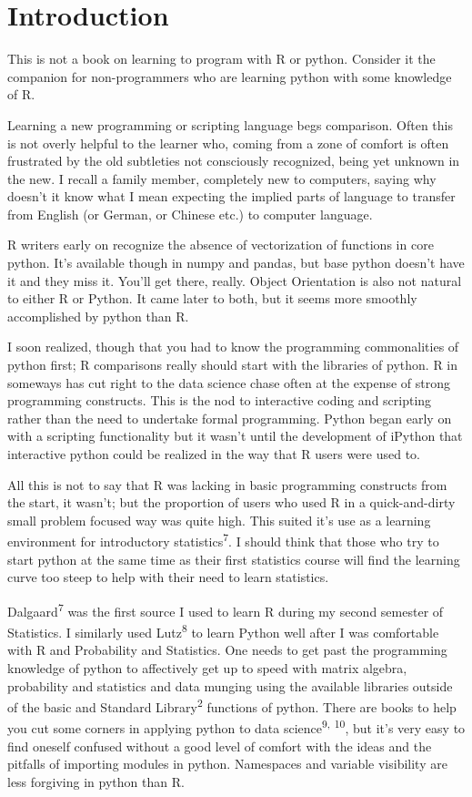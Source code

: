 \documentclass[]{book}
\theoremstyle{definition}
\theoremstyle{definition}
\theoremstyle{definition}
\theoremstyle{remark}
\begin{document}
\chapter{Introduction}\label{introduction}

This is not a book on learning to program with R or python. Consider it
the companion for non-programmers who are learning python with some
knowledge of R.

Learning a new programming or scripting language begs comparison. Often
this is not overly helpful to the learner who, coming from a zone of
comfort is often frustrated by the old subtleties not consciously
recognized, being yet unknown in the new. I recall a family member,
completely new to computers, saying why doesn't it know what I mean
expecting the implied parts of language to transfer from English (or
German, or Chinese etc.) to computer language.

R writers early on recognize the absence of vectorization of functions
in core python. It's available though in numpy and pandas, but base
python doesn't have it and they miss it. You'll get there, really.
Object Orientation is also not natural to either R or Python. It came
later to both, but it seems more smoothly accomplished by python than R.

I soon realized, though that you had to know the programming
commonalities of python first; R comparisons really should start with
the libraries of python. R in someways has cut right to the data science
chase often at the expense of strong programming constructs. This is the
nod to interactive coding and scripting rather than the need to
undertake formal programming. Python began early on with a scripting
functionality but it wasn't until the development of iPython that
interactive python could be realized in the way that R users were used
to.

All this is not to say that R was lacking in basic programming
constructs from the start, it wasn't; but the proportion of users who
used R in a quick-and-dirty small problem focused way was quite high.
This suited it's use as a learning environment for introductory
statistics\textsuperscript{7}. I should think that those who try to
start python at the same time as their first statistics course will find
the learning curve too steep to help with their need to learn
statistics.

Dalgaard\textsuperscript{7} was the first source I used to learn R
during my second semester of Statistics. I similarly used
Lutz\textsuperscript{8} to learn Python well after I was comfortable
with R and Probability and Statistics. One needs to get past the
programming knowledge of python to affectively get up to speed with
matrix algebra, probability and statistics and data munging using the
available libraries outside of the basic and Standard
Library\textsuperscript{2} functions of python. There are books to help
you cut some corners in applying python to data
science\textsuperscript{9,} \textsuperscript{10}, but it's very easy to
find oneself confused without a good level of comfort with the ideas and
the pitfalls of importing modules in python. Namespaces and variable
visibility are less forgiving in python than R.
\end{document}
